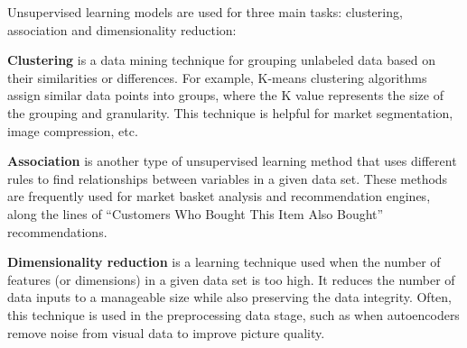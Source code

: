 Unsupervised learning models are used for three main tasks: clustering, association and dimensionality reduction:
	\begin{bulletedlist}
	\item \textbf{Clustering} is a data mining technique for grouping unlabeled data based on their similarities or differences. For example, K-means clustering algorithms assign similar data points into groups, where the K value represents the size of the grouping and granularity. This technique is helpful for market segmentation, image compression, etc.
	\item \textbf{Association} is another type of unsupervised learning method that uses different rules to find relationships between variables in a given data set. These methods are frequently used for market basket analysis and recommendation engines, along the lines of ``Customers Who Bought This Item Also Bought'' recommendations.
	\item \textbf{Dimensionality reduction} is a learning technique used when the number of features  (or dimensions) in a given data set is too high. It reduces the number of data inputs to a manageable size while also preserving the data integrity. Often, this technique is used in the preprocessing data stage, such as when autoencoders remove noise from visual data to improve picture quality.
	\end{bulletedlist}
